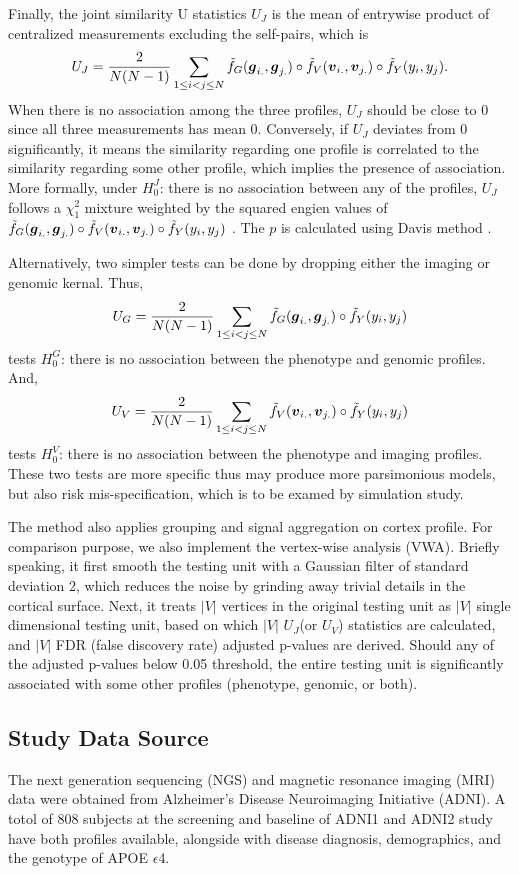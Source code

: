 {Finally, the joint similarity U statistics $U_J$ is the mean of entrywise product of centralized measurements excluding the self-pairs, which is
\[ U_J = \frac{2}{N(N-1)} \sum_{1 \leq i < j \leq N}^{} \tilde{f}_G(\boldsymbol{g}_{i.}, \boldsymbol{g}_{j.}) \circ \tilde{f}_V(\boldsymbol{v}_{i.}, \boldsymbol{v}_{j.}) \circ \tilde{f}_Y(y_i, y_j). \]
When there is no association among the three profiles, $U_J$ should be close to $0$ since all three measurements has mean $0$. Conversely, if $U_J$ deviates from $0$ significantly, it means the similarity regarding one profile is correlated to the similarity regarding some other profile, which implies the presence of association. More formally, under $H_0^J$: there is no association between any of the profiles, $U_J$ follows a $\chi_1^2$ mixture weighted by the squared engien values of $\tilde{f}_G(\boldsymbol{g}_{i.}, \boldsymbol{g}_{j.}) \circ \tilde{f}_V(\boldsymbol{v}_{i.}, \boldsymbol{v}_{j.}) \circ \tilde{f}_Y(y_i, y_j)$ \cite{UST1, UST2}. The $p$ is calculated using Davis method \cite{davies80}.

Alternatively, two simpler tests can be done by dropping either the imaging or genomic kernal. Thus,
\[ U_G = \frac{2}{N(N-1)} \sum_{1 \leq i < j \leq N}^{} \tilde{f}_G(\boldsymbol{g}_{i.}, \boldsymbol{g}_{j.}) \circ \tilde{f}_Y(y_i, y_j) \]
tests $H_0^G$: there is no association between the phenotype and genomic profiles. And,
\[ U_V = \frac{2}{N(N-1)} \sum_{1 \leq i < j \leq N}^{} \tilde{f}_V(\boldsymbol{v}_{i.}, \boldsymbol{v}_{j.}) \circ \tilde{f}_Y(y_i, y_j) \]
tests $H_0^V$: there is no association between the phenotype and imaging profiles. These two tests are more specific thus may produce more parsimonious models, but also risk mis-specification, which is to be examed by simulation study.

The method also applies grouping and signal aggregation on cortex profile. For comparison purpose, we also implement the vertex-wise analysis (VWA). Briefly speaking, it first smooth the testing unit with a Gaussian filter of standard deviation 2, which reduces the noise by grinding away trivial details in the cortical surface. Next, it treats $|V|$ vertices in the original testing unit as $|V|$ single dimensional testing unit, based on which $|V|$ $U_J$(or $U_V$) statistics are calculated, and $|V|$ FDR (false discovery rate) adjusted p-values are derived. Should any of the adjusted p-values below 0.05 threshold, the entire testing unit is significantly associated with some other profiles (phenotype, genomic, or both).

\subsection{Study Data Source}
The next generation sequencing (NGS) and magnetic resonance imaging (MRI) data were obtained from Alzheimer’s Disease Neuroimaging Initiative (ADNI). A totol of 808 subjects at the screening and baseline of ADNI1 and ADNI2 study have both profiles available, alongside with disease diagnosis, demographics, and the genotype of APOE $\epsilon$4. 

}

